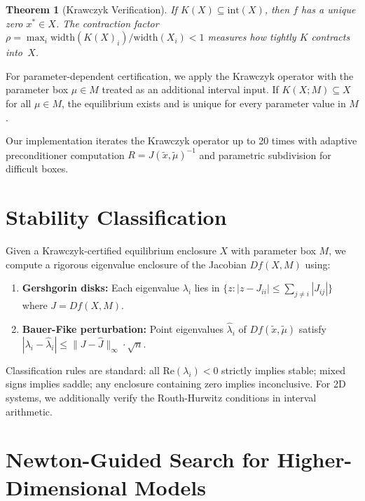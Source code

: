 \documentclass[11pt]{article}
\newtheorem{theorem}{Theorem}
\newcommand{\norm}[1]{\|#1\|}
\begin{document}
\begin{theorem}[Krawczyk Verification]
\label{thm:krawczyk}
If $K(X) \subseteq \mathrm{int}(X)$, then $f$ has a unique zero $x^* \in X$.
The contraction factor $\rho = \max_i \mathrm{width}(K(X)_i) / \mathrm{width}(X_i) < 1$ measures how tightly $K$ contracts into~$X$.
\end{theorem}

For parameter-dependent certification, we apply the Krawczyk operator with the parameter box $\mu \in M$ treated as an additional interval input.
If $K(X; M) \subseteq X$ for all $\mu \in M$, the equilibrium exists and is unique for every parameter value in $M$.

Our implementation iterates the Krawczyk operator up to 20 times with adaptive preconditioner computation $R = J(\tilde{x}, \tilde{\mu})^{-1}$ and parametric subdivision for difficult boxes.

\section{Stability Classification}
\label{sec:stability}

Given a Krawczyk-certified equilibrium enclosure $X$ with parameter box $M$, we compute a rigorous eigenvalue enclosure of the Jacobian $Df(X, M)$ using:

\begin{enumerate}
\item \textbf{Gershgorin disks:} Each eigenvalue $\lambda_i$ lies in $\{z : |z - J_{ii}| \leq \sum_{j \neq i} |J_{ij}|\}$ where $J = Df(X, M)$.

\item \textbf{Bauer-Fike perturbation:} Point eigenvalues $\hat{\lambda}_i$ of $Df(\tilde{x}, \tilde{\mu})$ satisfy $|\lambda_i - \hat{\lambda}_i| \leq \norm{J - \hat{J}}_\infty \cdot \sqrt{n}$.
\end{enumerate}

Classification rules are standard: all $\mathrm{Re}(\lambda_i) < 0$ strictly implies stable; mixed signs implies saddle; any enclosure containing zero implies inconclusive.
For 2D systems, we additionally verify the Routh-Hurwitz conditions in interval arithmetic.

\section{Newton-Guided Search for Higher-Dimensional Models}
\label{sec:newton}
\end{document}

